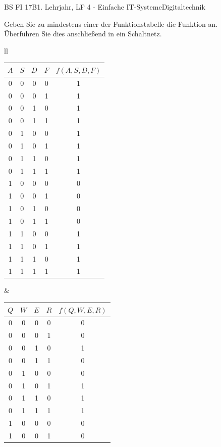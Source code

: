 \documentclass[oneside,openany,headings=optiontotoc,11pt,numbers=noenddot]{scrreprt}
\begin{document}
	\begin{worksheet}{BS FI 17B}{1. Lehrjahr, LF 4 - Einfache IT-Systeme}{Digitaltechnik}
		\begin{framed}
			Geben Sie zu mindestens einer der Funktionstabelle die Funktion an.\\
			Überführen Sie dies anschließend in ein Schaltnetz.\\
			\par\noindent
			\begin{tabular}{ll}
				\begin{tabularx}{0.45\textwidth}{c|c|c|c|c}
					\(A\) & \(S\) & \(D\) & \(F\) & \(f(A, S, D, F)\)\\
					\hline
					0 & 0 & 0 & 0 & 1\\
					0 & 0 & 0 & 1 & 1\\
					0 & 0 & 1 & 0 & 1\\
					0 & 0 & 1 & 1 & 1\\
					0 & 1 & 0 & 0 & 1\\
					0 & 1 & 0 & 1 & 1\\
					0 & 1 & 1 & 0 & 1\\
					0 & 1 & 1 & 1 & 1\\
					1 & 0 & 0 & 0 & 0\\
					1 & 0 & 0 & 1 & 0\\
					1 & 0 & 1 & 0 & 0\\
					1 & 0 & 1 & 1 & 0\\
					1 & 1 & 0 & 0 & 1\\
					1 & 1 & 0 & 1 & 1\\
					1 & 1 & 1 & 0 & 1\\
					1 & 1 & 1 & 1 & 1
				\end{tabularx} &
				\begin{tabularx}{0.45\textwidth}{c|c|c|c|c}
					\(Q\) & \(W\) & \(E\) & \(R\) & \(f(Q, W, E, R)\)\\
					\hline
					0 & 0 & 0 & 0 & 0\\
					0 & 0 & 0 & 1 & 0\\
					0 & 0 & 1 & 0 & 1\\
					0 & 0 & 1 & 1 & 0\\
					0 & 1 & 0 & 0 & 0\\
					0 & 1 & 0 & 1 & 1\\
					0 & 1 & 1 & 0 & 1\\
					0 & 1 & 1 & 1 & 1\\
					1 & 0 & 0 & 0 & 0\\
					1 & 0 & 0 & 1 & 0\\

\end{tabularx}
\end{tabular}
\end{framed}
\end{worksheet}
\end{document}
